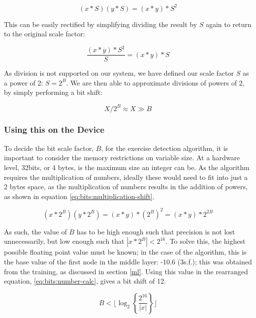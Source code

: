 \begin{equation}
\label{eq:bits:multiplication}
(x*S)(y*S)=(x*y)*S^2
\end{equation}

This can be easily rectified by simplifying dividing the result by $S$ again to return to the original scale factor:

\begin{equation}
\label{eq:bits:rescale}
\frac{(x*y)*S^2}{S}=(x*y)*S
\end{equation}

As division is not supported on our system, we have defined our scale factor $S$ as a power of 2: $S=2^B$. We are then able to approximate divisions of powers of 2, by simply performing a bit shift:

\begin{equation}
\label{eq:bits:div_approx}
X/2^B\approx X \gg B
\end{equation}

\subsubsection{Using this on the Device}

To decide the bit scale factor, $B$, for the exercise detection algorithm, it is important to consider the memory restrictions on variable size. At a hardware level, 32bits, or 4 bytes, is the maximum size an integer can be. As the algorithm requires the multiplication of numbers, ideally these would need to fit into just a 2 bytes space, as the multiplication of numbers results in the addition of powers, as shown in equation \ref{eq:bits:multiplication-shift}.

\begin{equation}
\label{eq:bits:multiplication-shift}
(x*2^B)(y*2^B)=(x*y)*(2^B)^2=(x*y)*2^{2B}
\end{equation}

As such, the value of $B$ has to be high enough such that precision is not lost unnecessarily, but low enough such that $|x*2^B|<2^{16}$. To solve this, the highest possible floating point value must be known; in the case of the algorithm, this is the base value of the first node in the middle layer: -10.6 (3s.f.); this was obtained from the training, as discussed in section \ref{ml}. Using this value in the rearranged equation, \ref{eq:bits:number-calc}, gives a bit shift of 12.

\begin{equation}
\label{eq:bits:number-calc}
B<\lfloor\log_{2}\left\{\frac{2^{16}}{|x|}\right\}\rfloor
\end{equation}

